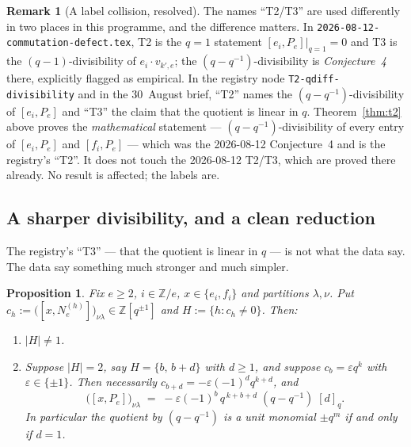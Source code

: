 \documentclass[11pt]{article}
\theoremstyle{plain}
\newtheorem{proposition}[theorem]{Proposition}
\theoremstyle{definition}
\newtheorem{remark}[theorem]{Remark}
\newcommand{\qq}{(q-q^{-1})}
\newcommand{\N}[1]{N_e^{(#1)}}
\begin{document}
\begin{remark}[A label collision, resolved]\label{rem:labels}
The names ``T2/T3'' are used differently in two places in this programme, and
the difference matters.  In \texttt{2026-08-12-commutation-defect.tex}, T2 is
the $q=1$ statement $[e_i,P_e]|_{q=1}=0$ and T3 is the $(q-1)$-divisibility of
$e_i\cdot v_{k',e}$; the $\qq$-divisibility is \emph{Conjecture~4} there,
explicitly flagged as empirical.  In the registry node
\texttt{T2-qdiff-divisibility} and in the 30~August brief, ``T2'' names the
$\qq$-divisibility of $[e_i,P_e]$ and ``T3'' the claim that the quotient is
linear in $q$.  Theorem~\ref{thm:t2} above proves the \emph{mathematical}
statement --- $\qq$-divisibility of every entry of $[e_i,P_e]$ and $[f_i,P_e]$
--- which was the 2026-08-12 Conjecture~4 and is the registry's ``T2''.  It
does not touch the 2026-08-12 T2/T3, which are proved there already.  No
result is affected; the labels are.
\end{remark}

\subsection{A sharper divisibility, and a clean reduction}
\label{sec:sharp}

The registry's ``T3'' --- that the quotient is linear in $q$ --- is not what
the data say.  The data say something much stronger and much simpler.

\begin{proposition}\label{prop:reduction}
Fix $e\ge2$, $i\in\mathbb{Z}/e$, $x\in\{e_i,f_i\}$ and partitions
$\lambda,\nu$.  Put $c_h:=\bigl([x,\N{h}]\bigr)_{\nu\lambda}\in
\mathbb{Z}[q^{\pm1}]$ and $H:=\{h: c_h\ne0\}$.  Then:
\begin{enumerate}
\item $|H|\ne1$.
\item Suppose $|H|=2$, say $H=\{b,\,b+d\}$ with $d\ge1$, and suppose
  $c_b=\varepsilon q^{k}$ with $\varepsilon\in\{\pm1\}$.  Then necessarily
  $c_{b+d}=-\varepsilon(-1)^{d}q^{k+d}$, and
  \[
    \bigl([x,P_e]\bigr)_{\nu\lambda}
      \;=\; -\varepsilon(-1)^{b}\,q^{\,k+b+d}\;\qq\;[d]_q .
  \]
  In particular the quotient by $\qq$ is a unit monomial $\pm q^{m}$ if and
  only if $d=1$.
\end{enumerate}
\end{proposition}
\end{document}
